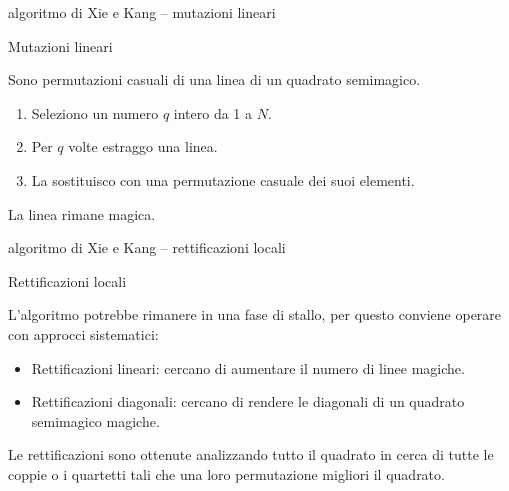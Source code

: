 \documentclass[10pt]{beamer}
\begin{document}
\begin{frame}{algoritmo di Xie e Kang -- mutazioni lineari}
	\begin{block}{Mutazioni lineari}
		\parbox{0.97\columnwidth}{
			 Sono permutazioni casuali di una linea di un quadrato semimagico.
			 \vspace*{-15pt}
			 \begin{enumerate}
				\item Seleziono un numero $ q $ intero da 1 a $ N $.
				\item Per $ q $ volte estraggo una linea.
				\item La sostituisco con una permutazione casuale dei suoi elementi.
			\end{enumerate}
			La linea rimane magica.
		}
	\end{block}
\end{frame}

\begin{frame}{algoritmo di Xie e Kang -- rettificazioni locali}
	\begin{block}{Rettificazioni locali}
		\parbox{0.98\columnwidth}{
			L'algoritmo potrebbe rimanere in una fase di stallo, per questo conviene operare con approcci sistematici:
			\begin{itemize}
				\item \alert{Rettificazioni lineari}: cercano di aumentare il numero di linee magiche.
				\item \alert{Rettificazioni diagonali}: cercano di rendere le diagonali di un quadrato semimagico magiche.
			\end{itemize}
			Le rettificazioni sono ottenute analizzando tutto il quadrato in cerca di tutte le coppie o i quartetti tali che una loro permutazione migliori il quadrato. 
		}
	\end{block}
\end{frame}
\end{document}
